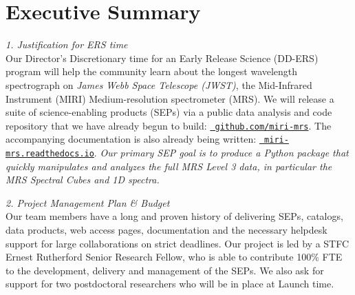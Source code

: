 \vspace{-4pt}
\section*{{\sc Executive Summary}}
\vspace{-6pt}
\noindent
{\it 1. Justification for ERS time}\\
Our Director’s Discretionary time for an Early Release Science
(DD-ERS) program will help the community learn about the longest
wavelength spectrograph on {\it James Webb Space Telescope (JWST)},
the Mid-Infrared Instrument (MIRI) Medium-resolution spectrometer
(MRS).  We will release a suite of science-enabling products (SEPs)
via a public data analysis and code repository that we have already
begun to build: \href{https://github.com/miri-mrs}{\tt
github.com/miri-mrs}.  The accompanying documentation is also already
being written: \href{http://miri-mrs.readthedocs.io/}{{\tt
miri-mrs.readthedocs.io}}.
{\it Our primary SEP goal is to produce a Python package that quickly
manipulates and analyzes the full MRS Level 3 data, in particular the
MRS Spectral Cubes and 1D spectra. }

\smallskip %
\smallskip \smallskip
\noindent
{\it 2. Project Management Plan \& Budget} \\
Our team members have a long and proven history of delivering SEPs, 
catalogs, data products, web access pages, documentation and the
necessary helpdesk support for large collaborations on strict
deadlines.  Our project is led by a STFC Ernest Rutherford Senior
Research Fellow, who is able to contribute 100\% FTE to the
development, delivery and management of the SEPs.  We also ask for
support for two postdoctoral researchers who will be in place at
Launch time.

